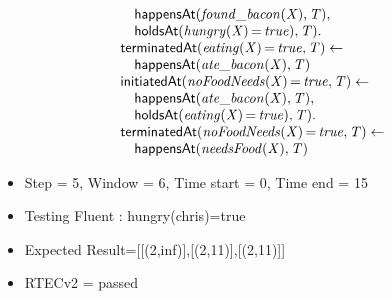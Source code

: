 \documentclass[8pt]{beamer}
\DeclareMathOperator{\val}{=}  %
\def \patsize {}
\def\happensAt{\textsf{\patsize happensAt}}
\def\holdsAt{\textsf{\patsize holdsAt}}
\def\initiatedAt{\textsf{\patsize initiatedAt}}
\def\terminatedAt{\textsf{\patsize terminatedAt}}
\newenvironment{mysplit}%
  {\arraycolsep 0pt \begin{array}{l}}%
  {\end{array}}
\begin{document}
\begin{frame}
\begin{minipage}{0.55\linewidth}
\begin{align*}
\begin{mysplit}
                \quad    \happensAt\mathit{(found\_bacon(X),T),}\\
                \quad    \holdsAt\mathit{(hungry(X)\val true),T).}\\
                \terminatedAt\mathit{(eating(X)\val true,T)\leftarrow}\\
                \quad    \happensAt\mathit{(ate\_bacon(X),T)}\\
                \initiatedAt\mathit{(noFoodNeeds(X)\val true,T)\leftarrow}\\
                \quad    \happensAt\mathit{(ate\_bacon(X),T),}\\
                \quad    \holdsAt\mathit{(eating(X)\val true),T).}\\
                \terminatedAt\mathit{(noFoodNeeds(X)\val true,T)\leftarrow}\\
                \quad    \happensAt\mathit{(needsFood(X),T)}\\
            \end{mysplit}
        \end{align*}
    \end{minipage}
    \begin{itemize}
        \item  Step = 5, Window = 6, Time start = 0, Time end = 15
        \item Testing Fluent :  hungry(chris)=true
        \item Expected Result=[[(2,inf)],[(2,11)],[(2,11)]]
        \item RTECv2 = passed
    \end{itemize}
\end{frame}
\end{document}
